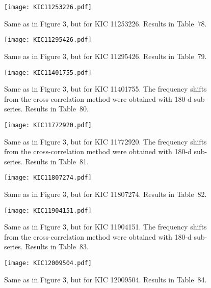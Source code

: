 \documentclass[twocolumn]{aastex61}%
\begin{document}
\begin{figure}[ht]
\texttt{[image: KIC11253226.pdf]}
\caption{Same as in Figure 3, but for KIC 11253226. Results in Table~78.}\label{fig:11253226}%
\end{figure}

\begin{figure}[ht]
\texttt{[image: KIC11295426.pdf]}\vspace{-0.2cm}
\caption{Same as in Figure 3, but for KIC 11295426. Results in Table~79.}\label{fig:11295426}%
\end{figure}

\begin{figure}[ht]
\texttt{[image: KIC11401755.pdf]}\vspace{-0.2cm}
\caption{Same as in Figure 3, but for KIC 11401755. The frequency shifts from the cross-correlation method were obtained with 180-d sub-series. Results in Table~80.}\label{fig:11401755}\vspace{-1.5cm}%
\end{figure}

\begin{figure}[ht]
\texttt{[image: KIC11772920.pdf]}\vspace{-0.2cm}
\caption{Same as in Figure 3, but for KIC 11772920. The frequency shifts from the cross-correlation method were obtained with 180-d sub-series. Results in Table~81.}\label{fig:11772920}\vspace{-0.3cm}%
\end{figure}

\begin{figure}[ht]
\texttt{[image: KIC11807274.pdf]}\vspace{-0.2cm}
\caption{Same as in Figure 3, but for KIC 11807274. Results in Table~82.}\label{fig:11807274}\vspace{-1cm}%
\end{figure}

\begin{figure}[ht]
\texttt{[image: KIC11904151.pdf]}
\caption{Same as in Figure 3, but for KIC 11904151. The frequency shifts from the cross-correlation method were obtained with 180-d sub-series. Results in Table~83.}\label{fig:11904151}%
\end{figure}

\begin{figure}[ht]
\texttt{[image: KIC12009504.pdf]}
\caption{Same as in Figure 3, but for KIC 12009504. Results in Table~84.}\label{fig:12009504}%
\end{figure}
\end{document}

